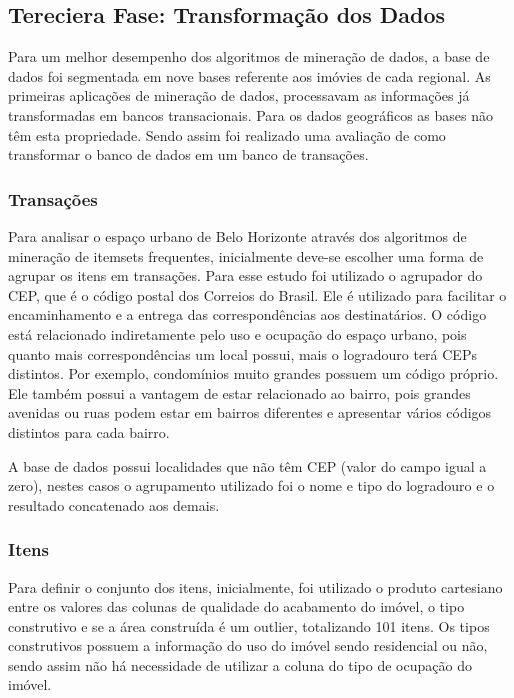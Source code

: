 \documentclass[12pt]{article}
\begin{document}
\subsection{Tereciera Fase: Transformação dos Dados}

Para um melhor desempenho dos algoritmos de mineração de dados, a base de dados foi segmentada em nove bases referente aos imóvies de cada regional. As primeiras aplicações de mineração de dados, processavam as informações já transformadas em bancos transacionais. Para os dados geográficos as bases não têm esta propriedade. Sendo assim foi realizado uma avaliação de como transformar o banco de dados em um banco de transações.

\subsubsection{Transações}
Para analisar o espaço urbano de Belo Horizonte através dos algoritmos de mineração de itemsets frequentes, inicialmente deve-se escolher uma forma de agrupar os itens em transações. Para esse estudo foi utilizado o agrupador do CEP, que é o código postal dos Correios do Brasil. Ele é utilizado para facilitar o encaminhamento e a entrega das correspondências aos destinatários. O código está relacionado indiretamente pelo uso e ocupação do espaço urbano, pois quanto mais correspondências um local possui, mais o logradouro terá CEPs distintos. Por exemplo, condomínios muito grandes possuem um código próprio. Ele também possui a vantagem de estar relacionado ao bairro, pois grandes avenidas ou ruas podem estar em bairros diferentes e apresentar vários códigos distintos para cada bairro. 

 A base de dados possui localidades que não têm CEP (valor do campo igual a zero), nestes casos o agrupamento utilizado foi o nome e tipo do logradouro e o resultado concatenado aos demais.
 
 \subsubsection{Itens}
 Para definir o conjunto dos itens, inicialmente, foi utilizado o produto cartesiano entre os valores das colunas de qualidade do acabamento do imóvel, o tipo construtivo e se a área construída é um outlier, totalizando 101 itens. Os tipos construtivos possuem a informação do uso do imóvel sendo residencial ou não, sendo assim não há necessidade de utilizar a coluna do tipo de ocupação do imóvel.
\end{document}
